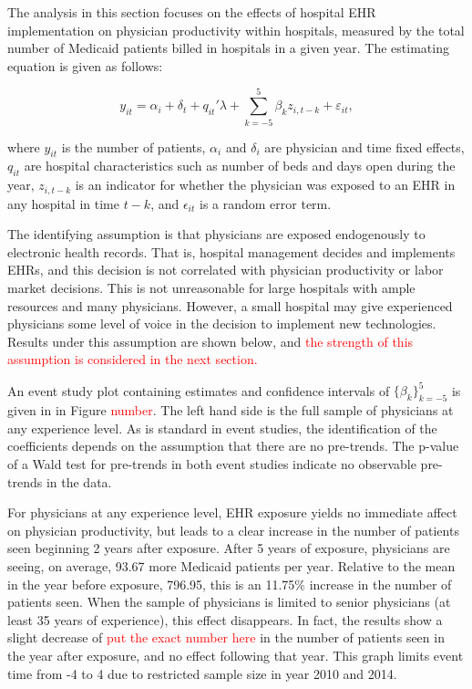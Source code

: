 \documentclass[11pt]{article}
\begin{document}
The analysis in this section focuses on the effects of hospital EHR implementation on physician productivity within hospitals, measured by the total number of Medicaid patients billed in hospitals in a given year. The estimating equation is given as follows: 

\begin{equation*}
    y_{it}=\alpha_i+\delta_t+q_{it}'\lambda+\sum_{k=-5}^5 \beta_kz_{i,t-k} + \varepsilon_{it},
\end{equation*}

where $y_{it}$ is the number of patients, $\alpha_i$ and $\delta_i$ are physician and time fixed effects, $q_{it}$ are hospital characteristics such as number of beds and days open during the year, $z_{i,t-k}$ is an indicator for whether the physician was exposed to an EHR in any hospital in time $t-k$, and $\epsilon_{it}$ is a random error term. 

The identifying assumption is that physicians are exposed endogenously to electronic health records. That is, hospital management decides and implements EHRs, and this decision is not correlated with physician productivity or labor market decisions. This is not unreasonable for large hospitals with ample resources and many physicians. However, a small hospital may give experienced physicians some level of voice in the decision to implement new technologies. Results under this assumption are shown below, and  \textcolor{red}{the strength of this assumption is considered in the next section. } 

An event study plot containing estimates and confidence intervals of  $\{\beta_k\}_{k=-5}^5$  is given in in Figure \textcolor{red}{number}. The left hand side is the full sample of physicians at any experience level. As is standard in event studies, the identification of the coefficients depends on the assumption that there are no pre-trends. The p-value of a Wald test for pre-trends in both event studies indicate no observable pre-trends in the data.

For physicians at any experience level, EHR exposure yields no immediate affect on physician productivity, but leads to a clear increase in the number of patients seen beginning 2 years after exposure. After 5 years of exposure, physicians are seeing, on average, 93.67 more Medicaid patients per year. Relative to the mean in the year before exposure, 796.95, this is an 11.75\% increase in the number of patients seen. When the sample of physicians is limited to senior physicians (at least 35 years of experience), this effect disappears. In fact, the results show a slight decrease of \textcolor{red}{put the exact number here} in the number of patients seen in the year after exposure, and no effect following that year. This graph limits event time from -4 to 4 due to restricted sample size in year 2010 and 2014. 
\end{document}
